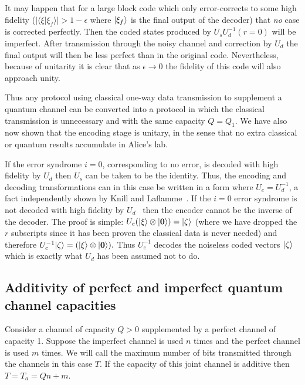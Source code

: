 It may happen that for a large block code which only error-corrects
to some high fidelity ($|\langle \xi | \xi_f \rangle| > 1-\epsilon$ 
where $| \xi_f \rangle$ is the final output of the decoder)
that {\em no} case is corrected perfectly.
Then the coded states produced by $U_sU_d^{-1}(r\!=\!0)$ will
be imperfect.  After transmission through the noisy
channel and correction by $U_d$ the final output will then be
less perfect than in the original code.  Nevertheless, because
of unitarity it is clear that as $\epsilon \rightarrow 0$ 
the fidelity of this code will also approach unity.

Thus any protocol using classical one-way data transmission
to supplement a quantum channel can be converted into a protocol
in which the classical transmission is unnecessary and with the
same capacity $Q=Q_1$.  We have also now shown that the
encoding stage is unitary, in the sense that no extra classical 
or quantum results accumulate in Alice's lab.  

If the error syndrome $i=0$, corresponding to no error, is 
decoded with high fidelity by $U_d$ then $U_s$ can be taken to be the 
identity.  Thus, the encoding and decoding transformations can 
in this case be written in a form where $U_e=U_d^{-1}$, a 
fact independently shown by Knill and Laflamme~\cite{lafknill}.  
If the $i=0$ error syndrome is not decoded with high fidelity by
$U_d$~\cite{footnonoise} then the encoder cannot be the inverse of 
the decoder.  The proof is simple:
$U_e(| \xi \rangle\otimes| \mbox{\boldmath{$0$}} \rangle)=| \zeta \rangle$ (where
we have dropped the $r$ subscripts since it has been proven the classical
data is never needed) and therefore 
$U_e^{-1}| \zeta \rangle=(| \xi \rangle\otimes| \mbox{\boldmath{$0$}} \rangle).$
Thus $U_e^{-1}$ decodes the noiseless coded vectors $| \zeta \rangle$ which
is exactly what $U_d$ has been assumed not to do.

\subsection{Additivity of perfect and imperfect quantum channel capacities}
\label{additivity}


Consider a channel of capacity $Q>0$ supplemented by a perfect
channel of capacity 1.  Suppose the imperfect channel is used
$n$ times and the perfect channel is used $m$ times.  We will call  
the maximum number of bits transmitted through the channels in this
case $T$.
If the capacity of this joint channel is additive then 
$T=T_a=Qn+m$.

